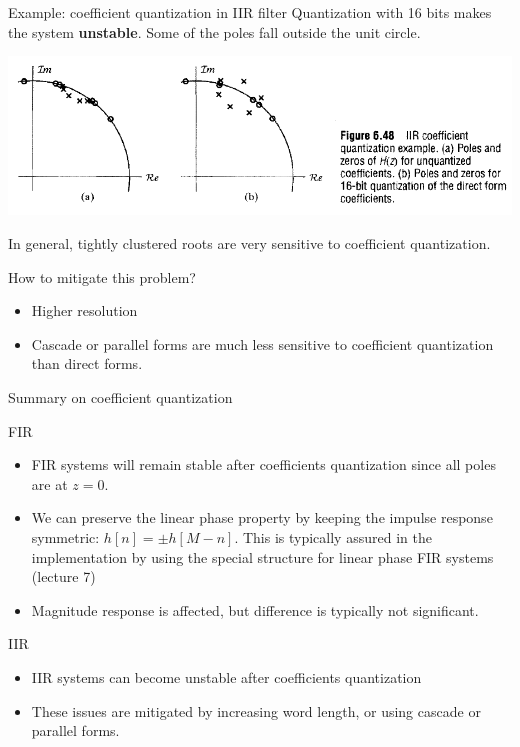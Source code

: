 \documentclass[10pt]{beamer}
\begin{document}
\begin{frame}{Example: coefficient quantization in IIR filter}	
Quantization with 16 bits makes the system \textbf{unstable}. Some of the poles fall outside the unit circle.
\begin{center}
\includegraphics[width=\textwidth]{figs/iir_coeff_quantiz.png}
\end{center}	

\pause
In general, tightly clustered roots are very sensitive to coefficient quantization.

How to mitigate this problem?
\begin{itemize}
\item Higher resolution
\item Cascade or parallel forms are much less sensitive to coefficient quantization than direct forms.
\end{itemize}
\end{frame}


\begin{frame}{Summary on coefficient quantization}
\begin{block}{FIR}
	\begin{itemize}
		\item FIR systems will remain stable after coefficients quantization since all poles are at $z = 0$.
		\item We can preserve the linear phase property by keeping the impulse response symmetric: $h[n] = \pm h[M-n]$. This is typically assured in the implementation by using the special structure for linear phase FIR systems (lecture 7)
		\item Magnitude response is affected, but difference is typically not significant.
	\end{itemize}
\end{block}

\begin{block}{IIR}
	\begin{itemize}
		\item IIR systems can become unstable after coefficients quantization
		\item These issues are mitigated by increasing word length, or using cascade or parallel forms.
	\end{itemize}
\end{block}

\end{frame}
\end{document}
